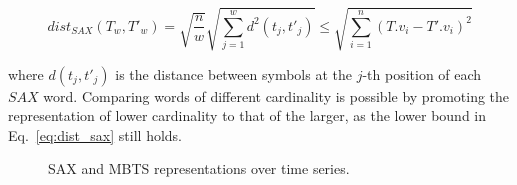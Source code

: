 \begin{equation} \label{eq:dist_sax}
dist_{SAX}(T_w, T'_w) =\sqrt{\frac{n}{w}} \sqrt{\sum_{j=1}^{w} d^2(t_j, t'_j) }  \leq {\sqrt{\displaystyle \sum_{i=1}^{n}(T.v_i - T'.v_i)^2}}
\end{equation}

\noindent where $d(t_j, t'_j)$ is the distance between symbols at the $j$-th position of each $SAX$ word. Comparing \isax words of different cardinality is possible by promoting the \isax representation of lower cardinality to that of the larger, as the lower bound in Eq.~\ref{eq:dist_sax} still holds.

\begin{figure}[tb]
 \centering
\caption{SAX and MBTS representations over time series.}
\label{fig:isax_example}
\end{figure}

